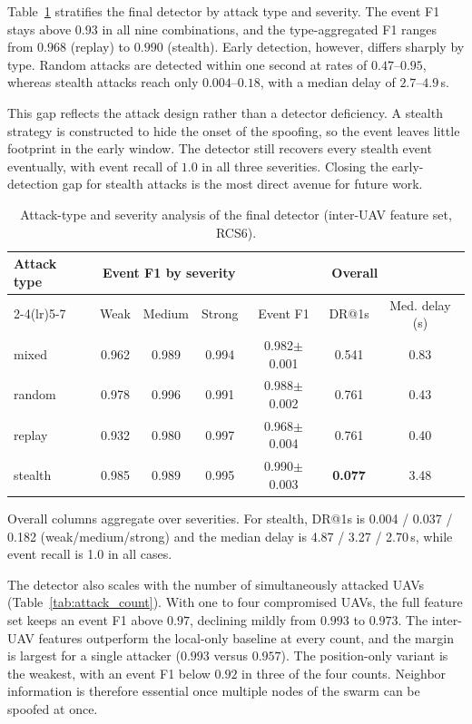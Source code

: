 Table~\ref{tab:attack_type_severity} stratifies the final detector by
attack type and severity. The event F1 stays above $0.93$ in all nine
combinations, and the type-aggregated F1 ranges from $0.968$ (replay) to
$0.990$ (stealth). Early detection, however, differs sharply by type.
Random attacks are detected within one second at rates of $0.47$--$0.95$,
whereas stealth attacks reach only $0.004$--$0.18$, with a median delay of
$2.7$--$4.9$\,s.

This gap reflects the attack design rather than a detector deficiency.
A stealth strategy is constructed to hide the onset of the spoofing, so the
event leaves little footprint in the early window. The detector still
recovers every stealth event eventually, with event recall of $1.0$ in all
three severities. Closing the early-detection gap for stealth attacks is the
most direct avenue for future work.

\begin{table}[htbp]
  \centering
  \caption{Attack-type and severity analysis of the final detector
    (inter-UAV feature set, RCS6).}
  \label{tab:attack_type_severity}
  \begin{tabular}{lccc ccc}
    \toprule
    \multirow{2}{*}{Attack type} & \multicolumn{3}{c}{Event F1 by severity}
      & \multicolumn{3}{c}{Overall} \\
    \cmidrule(lr){2-4}\cmidrule(lr){5-7}
    & Weak & Medium & Strong & Event F1 & DR@1s & Med. delay (s) \\
    \midrule
    mixed   & 0.962 & 0.989 & 0.994 & 0.982$\pm$0.001 & 0.541 & 0.83 \\
    random  & 0.978 & 0.996 & 0.991 & 0.988$\pm$0.002 & 0.761 & 0.43 \\
    replay  & 0.932 & 0.980 & 0.997 & 0.968$\pm$0.004 & 0.761 & 0.40 \\
    stealth & 0.985 & 0.989 & 0.995 & 0.990$\pm$0.003 & \textbf{0.077} & 3.48 \\
    \bottomrule
  \end{tabular}
  \smallskip
  \footnotesize{Overall columns aggregate over severities. For stealth,
  DR@1s is 0.004 / 0.037 / 0.182 (weak/medium/strong) and the median delay
  is 4.87 / 3.27 / 2.70\,s, while event recall is 1.0 in all cases.}
\end{table}

The detector also scales with the number of simultaneously attacked UAVs
(Table~\ref{tab:attack_count}). With one to four compromised UAVs, the full
feature set keeps an event F1 above $0.97$, declining mildly from $0.993$ to
$0.973$. The inter-UAV features outperform the local-only baseline at every
count, and the margin is largest for a single attacker ($0.993$ versus
$0.957$). The position-only variant is the weakest, with an event F1 below
$0.92$ in three of the four counts. Neighbor information is therefore
essential once multiple nodes of the swarm can be spoofed at once.

